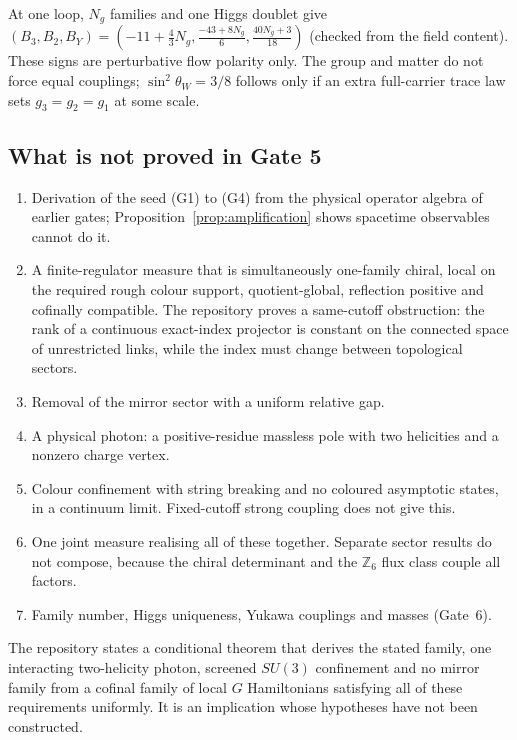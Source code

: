 \documentclass[11pt]{article}
\theoremstyle{definition}
\theoremstyle{remark}
\newcommand{\Z}{\mathbb{Z}}
\begin{document}
At one loop, $N_g$ families and one Higgs doublet give $(B_3,B_2,B_Y)=(-11+\tfrac43N_g,
\tfrac{-43+8N_g}{6},\tfrac{40N_g+3}{18})$ (checked from the field content). These signs
are perturbative flow polarity only. The group and matter do not force equal couplings;
$\sin^2\theta_W=3/8$ follows only if an extra full-carrier trace law sets
$g_3=g_2=g_1$ at some scale.

\subsection{What is not proved in Gate 5}

\begin{enumerate}
\item Derivation of the seed (G1) to (G4) from the physical operator algebra of earlier
  gates; Proposition~\ref{prop:amplification} shows spacetime observables cannot do it.
\item A finite-regulator measure that is simultaneously one-family chiral, local on the
  required rough colour support, quotient-global, reflection positive and cofinally
  compatible. The repository proves a same-cutoff obstruction: the rank of a continuous
  exact-index projector is constant on the connected space of unrestricted links, while
  the index must change between topological sectors.
\item Removal of the mirror sector with a uniform relative gap.
\item A physical photon: a positive-residue massless pole with two helicities and a
  nonzero charge vertex.
\item Colour confinement with string breaking and no coloured asymptotic states, in a
  continuum limit. Fixed-cutoff strong coupling does not give this.
\item One joint measure realising all of these together. Separate sector results do not
  compose, because the chiral determinant and the $\Z_6$ flux class couple all factors.
\item Family number, Higgs uniqueness, Yukawa couplings and masses (Gate~6).
\end{enumerate}
The repository states a conditional theorem that derives the stated family, one
interacting two-helicity photon, screened $SU(3)$ confinement and no mirror family from a
cofinal family of local $G$ Hamiltonians satisfying all of these requirements uniformly.
It is an implication whose hypotheses have not been constructed.

\end{document}
